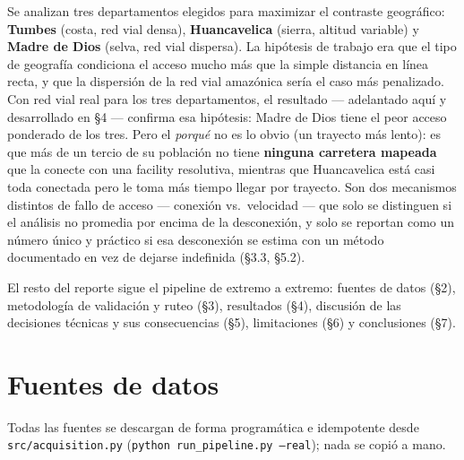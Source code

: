 \documentclass[11pt]{article}
\begin{document}
Se analizan tres departamentos elegidos para maximizar el contraste
geográfico: \textbf{Tumbes} (costa, red vial densa), \textbf{Huancavelica}
(sierra, altitud variable) y \textbf{Madre de Dios} (selva, red vial
dispersa). La hipótesis de trabajo era que el tipo de geografía condiciona
el acceso mucho más que la simple distancia en línea recta, y que la
dispersión de la red vial amazónica sería el caso más penalizado. Con red
vial real para los tres departamentos, el resultado --- adelantado aquí y
desarrollado en \S4 --- confirma esa hipótesis: Madre de Dios tiene el
peor acceso ponderado de los tres. Pero el \emph{porqué} no es lo obvio
(un trayecto más lento): es que más de un tercio de su población no tiene
\textbf{ninguna carretera mapeada} que la conecte con una facility
resolutiva, mientras que Huancavelica está casi toda conectada pero le
toma más tiempo llegar por trayecto. Son dos mecanismos distintos de fallo
de acceso --- conexión vs.\ velocidad --- que solo se distinguen si el
análisis no promedia por encima de la desconexión, y solo se reportan como
un número único y práctico si esa desconexión se estima con un método
documentado en vez de dejarse indefinida (\S3.3, \S5.2).

El resto del reporte sigue el pipeline de extremo a extremo: fuentes de
datos (\S2), metodología de validación y ruteo (\S3), resultados (\S4),
discusión de las decisiones técnicas y sus consecuencias (\S5),
limitaciones (\S6) y conclusiones (\S7).

\section{Fuentes de datos}

Todas las fuentes se descargan de forma programática e idempotente desde
\texttt{src/acquisition.py} (\texttt{python run\_pipeline.py --real}); nada
se copió a mano.
\end{document}
